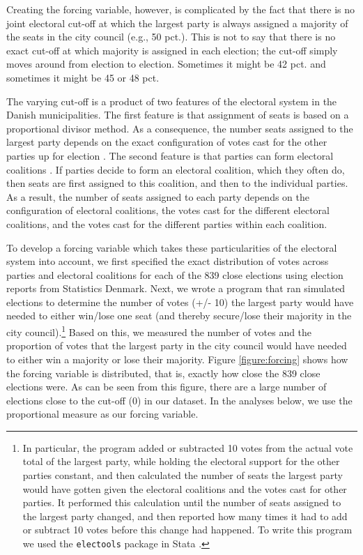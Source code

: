 \documentclass[a4paper,12pt]{article}
\begin{document}
Creating the forcing variable, however, is complicated by the fact that there is no joint electoral cut-off at which the largest party is always assigned a majority of the seats in the city council (e.g., 50 pct.). This is not to say that there is no exact cut-off at which majority is assigned in each election; the cut-off simply moves around from election to election. Sometimes it might be 42 pct. and sometimes it might be 45 or 48 pct. 

The varying cut-off is a product of two features of the electoral system in the Danish municipalities. The first feature is that assignment of seats is based on a proportional divisor method. As a consequence, the number seats assigned to the largest party depends on the exact configuration of votes cast for the other parties up for election \citep{fiva2013power,folke2014shades,freier2015parties}. The second feature is that parties can form electoral coalitions \citep{cox1997making}. If parties decide to form an electoral coalition, which they often do, then seats are first assigned to this coalition, and then to the individual parties. As a result, the number of seats assigned to each party depends on the configuration of electoral coalitions, the votes cast for the different electoral coalitions, and the votes cast for the different parties within each coalition.

To develop a forcing variable which takes these particularities of the electoral system into account, we first specified the exact distribution of votes across parties and electoral coalitions for each of the 839 close elections using election reports from Statistics Denmark. Next, we wrote a program that ran simulated elections to determine the number of votes (+/- 10) the largest party would have needed to either win/lose one seat (and thereby secure/lose their majority in the city council).\footnote{In particular, the program added or subtracted 10 votes from the actual vote total of the largest party, while holding the electoral support for the other parties constant, and then calculated the number of seats the largest party would have gotten given the electoral coalitions and the votes cast for other parties. It performed this calculation until the number of seats assigned to the largest party changed, and then reported how many times it had to add or subtract 10 votes before this change had happened. To write this program we used the \texttt{electools} package in Stata \citep{electools}.} Based on this, we measured the number of votes and the proportion of votes that the largest party in the city council would have needed to either win a majority or lose their majority. Figure \ref{figure:forcing} shows how the forcing variable is distributed, that is, exactly how close the 839 close elections were. As can be seen from this figure, there are a large number of elections close to the cut-off (0) in our dataset. In the analyses below, we use the proportional measure as our forcing variable. 
\end{document}
